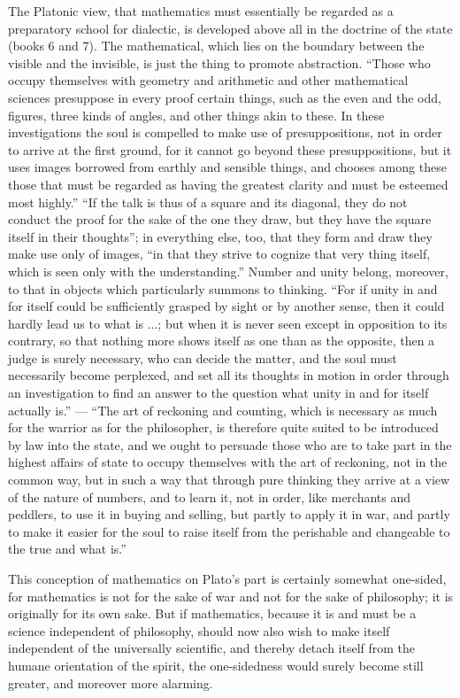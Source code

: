 \documentclass[12pt,a4paper,openany]{book}
\newcommand{\opage}[1]{\marginnote{\footnotesize\textit{[#1]}}}
\begin{document}
The Platonic view, that mathematics must essentially
be regarded as a preparatory school for dialectic, is developed above all
in the doctrine of the state (books 6 and 7). The mathematical,
which lies on the boundary between the visible and the
invisible, is just the thing to promote abstraction. ``Those
who occupy themselves with geometry and arithmetic and other
mathematical sciences presuppose in every proof
certain things, such as the even and the odd, figures, three kinds of
angles, and other things akin to these. In these
investigations the soul is compelled to make use of presuppositions, not
in order to arrive at the first ground, for it cannot go
beyond these presuppositions, but it uses images borrowed
from earthly and sensible things, and chooses among these
those that must be regarded as having the greatest clarity and must be esteemed
most highly.'' ``If the talk is thus of a square and its diagonal,
they do not conduct the proof for the sake of the one they draw, but they
have the square itself in their thoughts''; in everything
else, too, that they form and draw they make use only of images,
``in that they strive to cognize that very thing itself, which is seen only with
the understanding.'' Number and unity belong, moreover, to that in
objects which particularly summons to thinking. ``For if
\opage{II}unity in and for itself could be sufficiently grasped by
sight or by another sense, then it could hardly
lead us to what is ...; but when it is never seen except
in opposition to its contrary, so that nothing more shows
itself as one than as the opposite, then a judge is surely
necessary, who can decide the matter, and the soul must necessarily
become perplexed, and set all its thoughts in motion in order
through an investigation to find an answer to the question
what unity in and for itself actually is.'' --- ``The art of reckoning
and counting, which is necessary as much for the warrior as for the
philosopher, is therefore quite suited to be introduced by law
into the state, and we ought to persuade those who are to take part in the
highest affairs of state to occupy themselves with the art of reckoning,
not in the common way, but in such a way that through
pure thinking they arrive at a view of the nature of numbers,
and to learn it, not in order, like merchants and peddlers, to
use it in buying and selling, but partly to apply it in
war, and partly to make it easier for the soul to raise
itself from the perishable and changeable to the true and
what is.''

This conception of mathematics on Plato's part is certainly
somewhat one-sided, for mathematics is not for the sake of war
and not for the sake of philosophy; it is originally for its
own sake. But if mathematics, because it is and
must be a science independent of philosophy, should now also
wish to make itself independent of the universally scientific, and
thereby detach itself from the humane orientation of the spirit, the one-sidedness
would surely become still greater, and moreover more
alarming.
\end{document}
